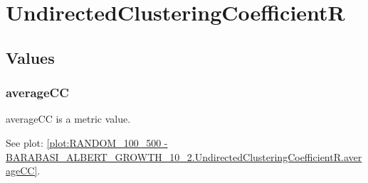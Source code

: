 %
%
\section{UndirectedClusteringCoefficientR}

\subsection{Values}
\subsubsection{averageCC}
averageCC is a metric value.

See plot: \ref{plot:RANDOM_100_500 - BARABASI_ALBERT_GROWTH_10_2.UndirectedClusteringCoefficientR.averageCC}.

